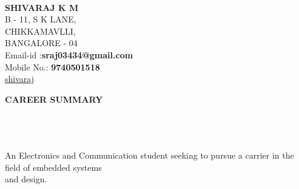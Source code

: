 \documentclass[a4paper,10pt]{article}
\newcommand{\lsep}{-0.5cm}
\newcommand{\resheading}[1]{{\small \colorbox{mygrey}{\begin{minipage}{0.975\textwidth}{\textbf{#1 \vphantom{p\^{E}}}}\end{minipage}}}}
\begin{document}
\hspace{0.5cm}\\[-0.2cm]



\textbf{SHIVARAJ K M} \\ 
\indent B - 11, S K LANE, \\
\indent CHIKKAMAVLLI,\\
\indent BANGALORE - 04\\
\indent Email-id :\textbf{sraj03434@gmail.com} \\
\indent Mobile No.: \textbf{9740501518} \\
\indent\faGithub\href{https://github.com/shiva-raj-km}{shivaraj}\hfill 
{}\\

\resheading{\textbf{CAREER SUMMARY} }\\[\lsep]\\ \\
\indent An Electronics and Communication student seeking to pursue a carrier in the field of embedded systems\\ \indent and design.\\
\end{document}
